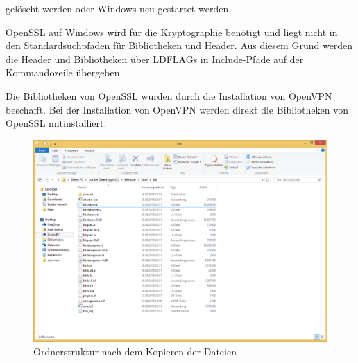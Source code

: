 gelöscht werden oder Windows neu gestartet werden.

OpenSSL auf Windows wird für die Kryptographie benötigt und liegt nicht in den Standardsuchpfaden
für Bibliotheken und Header. Aus diesem Grund werden die Header und Bibliotheken
über LDFLAGs in Include-Pfade auf der Kommandozeile übergeben.

Die Bibliotheken von OpenSSL wurden durch die Installation von OpenVPN beschafft.
Bei der Installation von OpenVPN werden direkt die Bibliotheken von OpenSSL mitinstalliert.

\begin{centering}
\begin{figure}
\includegraphics[width=\textwidth]{Bilder/Ordnerstruktur.png}
\caption{Ordnerstruktur nach dem Kopieren der Dateien}
\label{fig:Ordnerstruktur}
\end{figure}
\end{centering}

